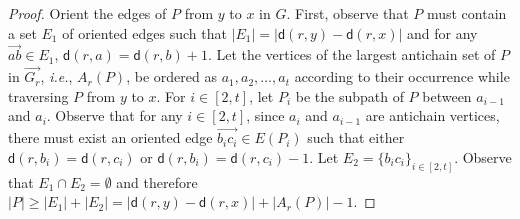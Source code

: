 \documentclass[a4paper]{article}
\newcommand{\dist}[2]{\mathsf{d}\left(#1,#2\right)}
\newcommand{\anticp}[2]{A_{#1}\left(#2\right)}
\newcommand{\ie}{\textit{i.e.\xspace}}
\newtheorem{observation}[theorem]{Observation}
\newcommand{\dd}[1]{\textcolor{red}{#1}}
\begin{document}
\begin{proof}
Orient the edges of $P$ from $y$ to $x$ in $G$. First, observe that $P$ must contain a set $E_1$ of oriented edges such that $|E_1|=|\dist{r}{y}-\dist{r}{x}|$ and for any $\overrightarrow{ab}\in E_1$, $\dist{r}{a}=\dist{r}{b}+1$. Let the vertices of the largest antichain set of $P$ in $\overrightarrow{G_r}$, \ie, $\anticp{r}{P}$, be ordered as $a_1,a_2,\ldots,a_t$ according to their occurrence while traversing $P$ from $y$ to $x$. For $i\in [2,t]$, let $P_i$ be the subpath of $P$ between $a_{i-1}$ and $a_i$. Observe that for any $i\in [2,t]$, since $a_i$ and $a_{i-1}$ are antichain vertices, there must exist an oriented edge $\overrightarrow{b_ic_i}\in E(P_i)$ such that either $\dist{r}{b_i} = \dist{r}{c_i}$ or $\dist{r}{b_i}=\dist{r}{c_i} - 1$. Let $E_2=\{b_ic_i\}_{i\in [2,t]}$. Observe that $E_1\cap E_2=\emptyset$ and therefore $|P|\geq |E_1| + |E_2| = |\dist{r}{y}-\dist{r}{x}| + |\anticp{r}{P}| - 1$.
\end{proof}    




\end{document}
